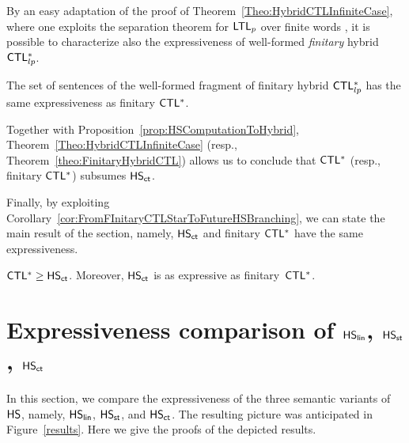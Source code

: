 By an easy adaptation of the proof of Theorem~\ref{Theo:HybridCTLInfiniteCase}, where one exploits the separation theorem for $\text{\sffamily LTL$_p$}$ over finite words \cite{Gabbay87}, it is possible to characterize also the expressiveness of well-formed \emph{finitary} hybrid $\text{\sffamily CTL$^{*}_{lp}$}$.

\begin{theorem}\label{theo:FinitaryHybridCTL} The set of sentences of the well-formed fragment of finitary hybrid $\text{\sffamily CTL$^{*}_{lp}$}$ has the same expressiveness as finitary $\text{\sffamily CTL$^{*}$}$.
\end{theorem}


Together with Proposition~\ref{prop:HSComputationToHybrid}, Theorem~\ref{Theo:HybridCTLInfiniteCase} 
(resp., Theorem~\ref{theo:FinitaryHybridCTL})
allows us to conclude that $\text{\sffamily CTL$^{*}$}$ (resp., finitary $\text{\sffamily CTL$^{*}$}$) subsumes $\text{\sffamily HS}_{\mathsf{ct}}$. 

Finally, by exploiting Corollary~\ref{cor:FromFInitaryCTLStarToFutureHSBranching}, we can state the main result of the section, namely, $\text{\sffamily HS}_{\mathsf{ct}}$ and finitary $\text{\sffamily CTL$^{*}$}$ have the same expressiveness.

\begin{theorem}\label{Cor:CharacterizationHSCompTree} $\text{\sffamily CTL$^{*}$}\geq\text{\sffamily HS}_{\mathsf{ct}}$. Moreover, $\text{\sffamily HS}_{\mathsf{ct}}$ is as expressive as finitary~$\text{\sffamily CTL$^{*}$}$.
\end{theorem}

\section{Expressiveness comparison of  $\text{\sffamily HS}_{\mathsf{lin}}$,  $\text{\sffamily HS}_{\mathsf{st}}$, $\text{\sffamily HS}_{\mathsf{ct}}$}\label{sect:allSems}

In this section, we compare the expressiveness of the three semantic variants of $\text{\sffamily HS}$, namely, $\text{\sffamily HS}_{\mathsf{lin}}$,  $\text{\sffamily HS}_{\mathsf{st}}$, and $\text{\sffamily HS}_{\mathsf{ct}}$. %
The resulting picture was anticipated in Figure~\ref{results}. Here we give the proofs of the depicted results.

